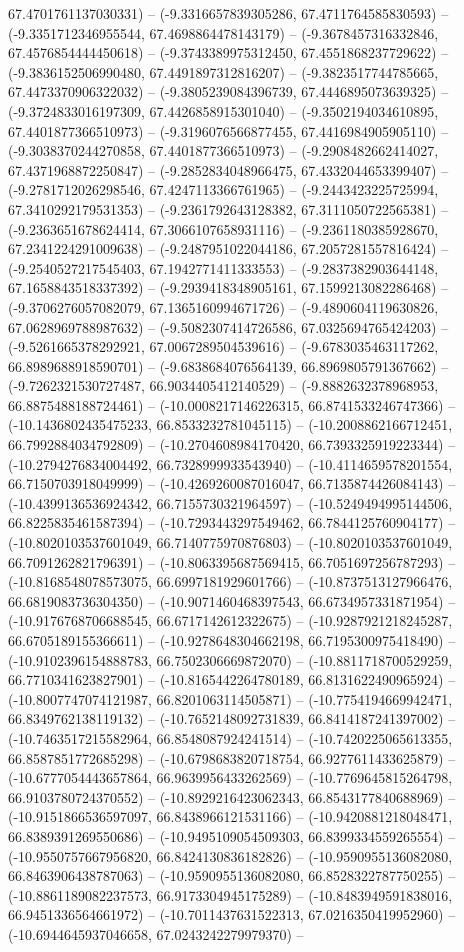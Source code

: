 67.4701761137030331) -- (-9.3316657839305286, 67.4711764585830593) -- (-9.3351712346955544, 67.4698864478143179) -- (-9.3678457316332846, 67.4576854444450618) -- (-9.3743389975312450, 67.4551868237729622) -- (-9.3836152506990480, 67.4491897312816207) -- (-9.3823517744785665, 67.4473370906322032) -- (-9.3805239084396739, 67.4446895073639325) -- (-9.3724833016197309, 67.4426858915301040) -- (-9.3502194034610895, 67.4401877366510973) -- (-9.3196076566877455, 67.4416984905905110) -- (-9.3038370244270858, 67.4401877366510973) -- (-9.2908482662414027, 67.4371968872250847) -- (-9.2852834048966475, 67.4332044653399407) -- (-9.2781712026298546, 67.4247113366761965) -- (-9.2443423225725994, 67.3410292179531353) -- (-9.2361792643128382, 67.3111050722565381) -- (-9.2363651678624414, 67.3066107658931116) -- (-9.2361180385928670, 67.2341224291009638) -- (-9.2487951022044186, 67.2057281557816424) -- (-9.2540527217545403, 67.1942771411333553) -- (-9.2837382903644148, 67.1658843518337392) -- (-9.2939418348905161, 67.1599213082286468) -- (-9.3706276057082079, 67.1365160994671726) -- (-9.4890604119630826, 67.0628969788987632) -- (-9.5082307414726586, 67.0325694765424203) -- (-9.5261665378292921, 67.0067289504539616) -- (-9.6783035463117262, 66.8989688918590701) -- (-9.6838684076564139, 66.8969805791367662) -- (-9.7262321530727487, 66.9034405412140529) -- (-9.8882632378968953, 66.8875488188724461) -- (-10.0008217146226315, 66.8741533246747366) -- (-10.1436802435475233, 66.8533232781045115) -- (-10.2008862166712451, 66.7992884034792809) -- (-10.2704608984170420, 66.7393325919223344) -- (-10.2794276834004492, 66.7328999933543940) -- (-10.4114659578201554, 66.7150703918049999) -- (-10.4269260087016047, 66.7135874426084143) -- (-10.4399136536924342, 66.7155730321964597) -- (-10.5249494995144506, 66.8225835461587394) -- (-10.7293443297549462, 66.7844125760904177) -- (-10.8020103537601049, 66.7140775970876803) -- (-10.8020103537601049, 66.7091262821796391) -- (-10.8063395687569415, 66.7051697256787293) -- (-10.8168548078573075, 66.6997181929601766) -- (-10.8737513127966476, 66.6819083736304350) -- (-10.9071460468397543, 66.6734957331871954) -- (-10.9176768706688545, 66.6717142612322675) -- (-10.9287921218245287, 66.6705189155366611) -- (-10.9278648304662198, 66.7195300975418490) -- (-10.9102396154888783, 66.7502306669872070) -- (-10.8811718700529259, 66.7710341623827901) -- (-10.8165442264780189, 66.8131622490965924) -- (-10.8007747074121987, 66.8201063114505871) -- (-10.7754194669942471, 66.8349762138119132) -- (-10.7652148092731839, 66.8414187241397002) -- (-10.7463517215582964, 66.8548087924241514) -- (-10.7420225065613355, 66.8587851772685298) -- (-10.6798683820718754, 66.9277611433625879) -- (-10.6777054443657864, 66.9639956433262569) -- (-10.7769645815264798, 66.9103780724370552) -- (-10.8929216423062343, 66.8543177840688969) -- (-10.9151866536597097, 66.8438966121531166) -- (-10.9420881218048471, 66.8389391269550686) -- (-10.9495109054509303, 66.8399334559265554) -- (-10.9550757667956820, 66.8424130836182826) -- (-10.9590955136082080, 66.8463906438787063) -- (-10.9590955136082080, 66.8528322787750255) -- (-10.8861189082237573, 66.9173304945175289) -- (-10.8483949591838016, 66.9451336564661972) -- (-10.7011437631522313, 67.0216350419952960) -- (-10.6944645937046658, 67.0243242279979370) -- 